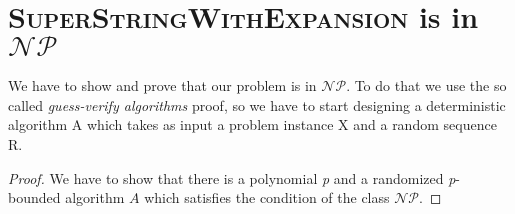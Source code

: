 \documentclass[paper=a4, fontsize=11pt]{scrartcl}
\numberwithin{equation}{section}		%
\numberwithin{figure}{section}			%
\numberwithin{table}{section}				%
\begin{document}
\section{\textsc{SuperStringWithExpansion} is in $\mathcal{NP}$}
We have to show and prove that our problem is in $\mathcal{NP}$. To do that we use the so called \textit{guess-verify algorithms} proof, so we have to start designing a deterministic algorithm A which takes as input a problem instance X and a random sequence R.

\begin{proof}
	We have to show that there is a polynomial \textit{p} and a randomized \textit{p}-bounded algorithm $A$ which satisfies the condition of the class $\mathcal{NP}$.
	 
	


\end{proof}
\end{document}
